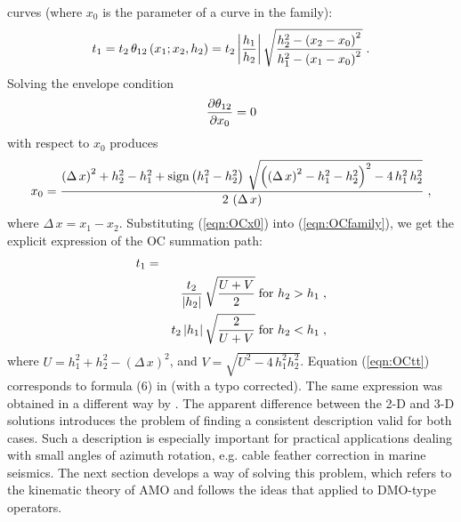 curves (where $x_0$ is the parameter of a curve in the family):
\begin{equation}
t_1=t_2\,\theta_{12}\left(x_1;x_2, h_2\right) =
t_2\,{\left| h_1 \over h_2\right|}\,
\sqrt{ {h_2^2-\left(x_2-x_0\right)^2} \over
{h_1^2-\left(x_1-x_0\right)^2}}\;.
\label{eqn:OCfamily}
\end{equation} 
Solving the envelope condition
\begin{equation}
{\partial \theta_{12} \over \partial x_0}=0
\label{eqn:OCenvelop}
\end{equation}
with respect to $x_0$ produces
\begin{equation}
x_0={{\left(\Delta\,x\right)^2+h_2^2-h_1^2+
\mbox{sign}\left(h_1^2-h_2^2\right)\,
\sqrt{\left(\left(\Delta\,x\right)^2-h_1^2-h_2^2\right)^2-4\,h_1^2\,h_2^2}}
\over {2\,\left(\Delta\,x\right)}}\;,
\label{eqn:OCx0}
\end{equation}
where $\Delta\,x=x_1-x_2$.
Substituting (\ref{eqn:OCx0}) into (\ref{eqn:OCfamily}), we get the explicit
expression of the OC summation path:
\begin{eqnarray}
t_1 & = & \nonumber \\
& & {t_2 \over \left|h_2\right|}\,\sqrt{{U+V} \over 2}
\;\mbox{for $h_2 > h_1$}\;, \nonumber \\
& & {t_2 \left|h_1\right|}\,\sqrt{2 \over {U+V}}
\;\mbox{for $h_2 < h_1$}\;, 
\label{eqn:OCtt}
\end{eqnarray}  
where $U=h_1^2+h_2^2-\left(\Delta\,x\right)^2$, and
$V=\sqrt{U^2-4\,h_1^2h_2^2}$.
Equation (\ref{eqn:OCtt}) corresponds to formula (6) in
\cite[]{Biondi.sep.80.125} (with a typo corrected). The same
expression was obtained in a different way by \cite{myDMO}. 
The apparent difference between the 2-D and 3-D solutions introduces the
problem of finding a consistent description valid for both cases.
Such a description is especially important for practical applications
dealing with small angles of azimuth rotation, e.g. cable feather
correction in marine seismics. The next section develops
a way of solving
this problem, which
refers to the kinematic theory of AMO and follows the ideas that
\cite{GPR29-03-03740406} applied
to DMO-type operators.

